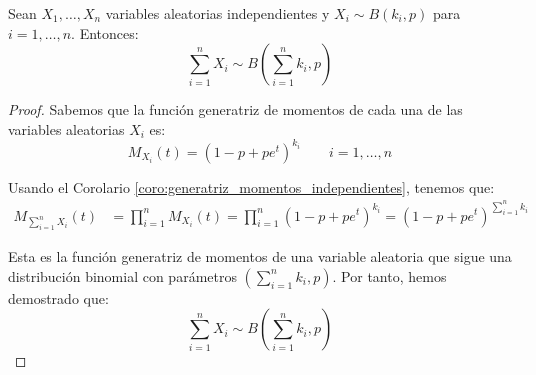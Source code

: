 \begin{prop}
    Sean $X_1, \dots, X_n$ variables aleatorias independientes y $X_i\sim B(k_i, p)$ para $i=1,\dots,n$. Entonces:
    \begin{equation*}
        \sum_{i=1}^{n}X_i \sim B\left(\sum_{i=1}^{n}k_i, p\right)
    \end{equation*}

    \begin{proof}
        Sabemos que la función generatriz de momentos de cada una de las variables aleatorias $X_i$ es:
        \begin{equation*}
            M_{X_i}(t) = (1-p+pe^t)^{k_i} \qquad i=1,\dots,n
        \end{equation*}

        Usando el Corolario \ref{coro:generatriz_momentos_independientes}, tenemos que:
        \begin{align*}
            M_{\sum\limits_{i=1}^{n}X_i}(t) &= \prod_{i=1}^{n}M_{X_i}(t) = \prod_{i=1}^{n}(1-p+pe^t)^{k_i} = (1-p+pe^t)^{\sum\limits_{i=1}^{n}k_i}
        \end{align*}

        Esta es la función generatriz de momentos de una variable aleatoria que sigue una distribución binomial con parámetros $\left(\sum\limits_{i=1}^{n}k_i, p\right)$. Por tanto, hemos demostrado que:
        \begin{equation*}
            \sum_{i=1}^{n}X_i \sim B\left(\sum_{i=1}^{n}k_i, p\right)
        \end{equation*}
    \end{proof}
\end{prop}

